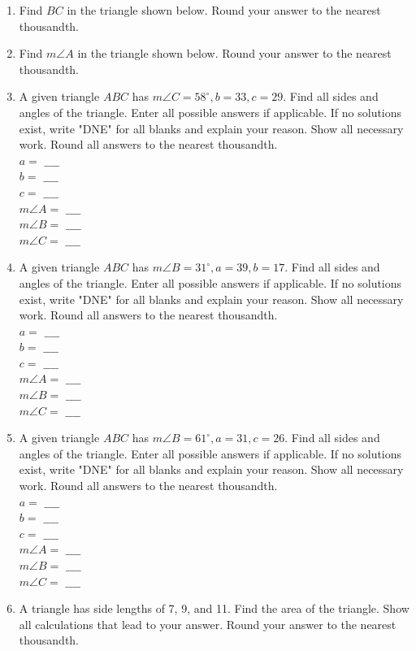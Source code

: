 \documentclass[10pt]{article}
\begin{document}
\begin{enumerate}
  \item Find $B C$ in the triangle shown below. Round your answer to the nearest thousandth.
  \item Find $m \angle A$ in the triangle shown below. Round your answer to the nearest thousandth.
  \item A given triangle $A B C$ has $m \angle C=58^{\circ}, b=33, c=29$. Find all sides and angles of the triangle. Enter all possible answers if applicable. If no solutions exist, write "DNE" for all blanks and explain your reason. Show all necessary work. Round all answers to the nearest thousandth.\\
$a=$ $\_\_\_\_$\\
$b=$ $\_\_\_\_$\\
$c=$ $\_\_\_\_$\\
$m \angle A=$ $\_\_\_\_$\\
$m \angle B=$ $\_\_\_\_$\\
$m \angle C=$ $\_\_\_\_$
  \item A given triangle $A B C$ has $m \angle B=31^{\circ}, a=39, b=17$. Find all sides and angles of the triangle. Enter all possible answers if applicable. If no solutions exist, write "DNE" for all blanks and explain your reason. Show all necessary work. Round all answers to the nearest thousandth.\\
$a=$ $\_\_\_\_$\\
$b=$ $\_\_\_\_$\\
$c=$ $\_\_\_\_$\\
$m \angle A=$ $\_\_\_\_$\\
$m \angle B=$ $\_\_\_\_$\\
$m \angle C=$ $\_\_\_\_$
  \item A given triangle $A B C$ has $m \angle B=61^{\circ}, a=31, c=26$. Find all sides and angles of the triangle. Enter all possible answers if applicable. If no solutions exist, write "DNE" for all blanks and explain your reason. Show all necessary work. Round all answers to the nearest thousandth.\\
$a=$ $\_\_\_\_$\\
$b=$ $\_\_\_\_$\\
$c=$ $\_\_\_\_$\\
$m \angle A=$ $\_\_\_\_$\\
$m \angle B=$ $\_\_\_\_$\\
$m \angle C=$ $\_\_\_\_$
  \item A triangle has side lengths of 7, 9, and 11. Find the area of the triangle. Show all calculations that lead to your answer. Round your answer to the nearest thousandth.
\end{enumerate}
\end{document}
